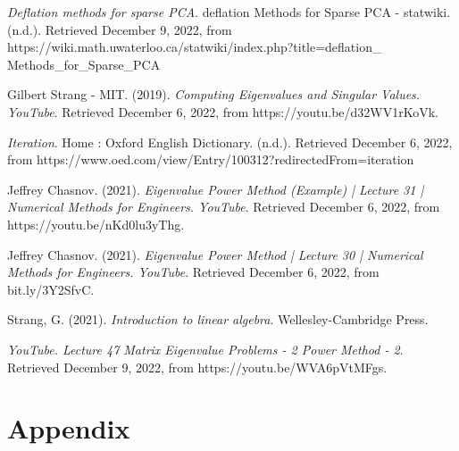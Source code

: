 \documentclass{article}
\begin{document}
\begin{thebibliography}{5}
%
{\it Deflation methods for sparse PCA}. deflation Methods for Sparse PCA - statwiki. (n.d.). Retrieved December 9, 2022, from https://wiki.math.uwaterloo.ca/statwiki/index.php?title=deflation\_\\Methods\_for\_Sparse\_PCA 

Gilbert Strang - MIT. (2019). {\it Computing Eigenvalues and Singular Values. YouTube}. Retrieved December 6, 2022, from https://youtu.be/d32WV1rKoVk.

{\it Iteration}. Home : Oxford English Dictionary. (n.d.). Retrieved December 6, 2022, from https://www.oed.com/view/Entry/100312?redirectedFrom=iteration

Jeffrey Chasnov. (2021). {\it Eigenvalue Power Method (Example) | Lecture 31 | Numerical Methods for Engineers. YouTube}. Retrieved December 6, 2022, from https://youtu.be/nKd0lu3yThg. 

Jeffrey Chasnov. (2021). {\it Eigenvalue Power Method | Lecture 30 | Numerical Methods for Engineers. YouTube}. Retrieved December 6, 2022, from bit.ly/3Y2SfvC. 

Strang, G. (2021). {\it Introduction to linear algebra}. Wellesley-Cambridge Press.

{\it YouTube. Lecture 47 Matrix Eigenvalue Problems - 2 Power Method - 2}. Retrieved December 9, 2022, from https://youtu.be/WVA6pVtMFgs. 

\end{thebibliography}

\section{Appendix}


\end{document}
